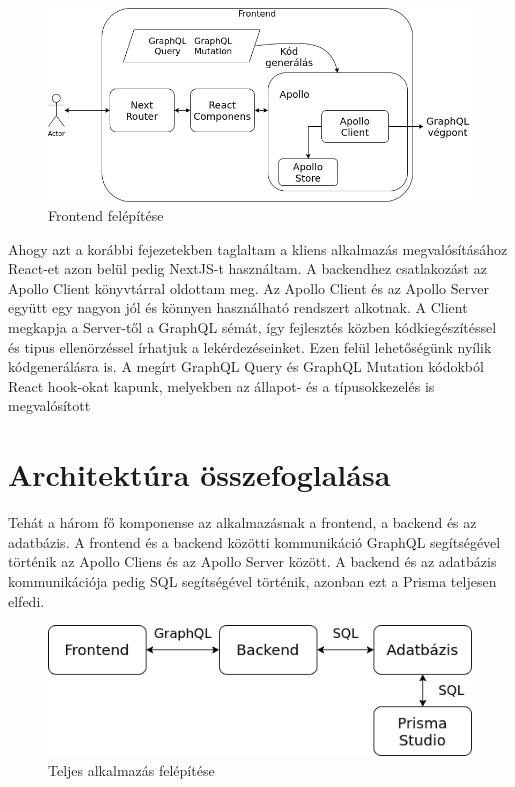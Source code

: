\begin{figure}[!ht]
  \centering
  \includegraphics[width=150mm, keepaspectratio]{figures/frontend.png}
  \caption{Frontend felépítése}
  \label{fig:frontend}
\end{figure}

Ahogy azt a korábbi fejezetekben taglaltam a kliens alkalmazás megvalósításához React-et azon belül pedig NextJS-t használtam.
A backendhez csatlakozást az Apollo Client könyvtárral oldottam meg. 
Az Apollo Client és az Apollo Server együtt egy nagyon jól és könnyen használható rendszert alkotnak.
A Client megkapja a Server-től a GraphQL sémát, így fejlesztés közben kódkiegészítéssel és tipus ellenörzéssel írhatjuk a lekérdezéseinket.
Ezen felül lehetőségünk nyílik kódgenerálásra is.
A megírt GraphQL Query és GraphQL Mutation kódokból React hook-okat kapunk, melyekben az állapot- és a típusokkezelés is megvalósított


\section{Architektúra összefoglalása}
Tehát a három fő komponense az alkalmazásnak a frontend, a backend és az adatbázis.
A frontend és a backend közötti kommunikáció GraphQL segítségével történik az Apollo Cliens és az Apollo Server között.
A backend és az adatbázis kommunikációja pedig SQL segítségével történik, azonban ezt a Prisma teljesen elfedi.

\begin{figure}[!ht]
  \centering
  \includegraphics[width=150mm, keepaspectratio]{figures/architecture.png}
  \caption{Teljes alkalmazás felépítése}
  \label{fig:architecture}
\end{figure}